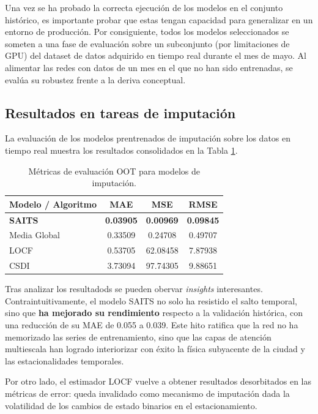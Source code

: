 Una vez se ha probado la correcta ejecución de los modelos en el conjunto histórico, es importante probar que estas tengan capacidad para generalizar en un entorno de producción. Por consiguiente, todos los modelos seleccionados se someten a una fase de evaluación sobre un subconjunto (por limitaciones de GPU) del dataset de datos adquirido en tiempo real durante el mes de mayo. Al alimentar las redes con datos de un mes en el que no han sido entrenadas, se evalúa su robustez frente a la deriva conceptual.

\subsection{Resultados en tareas de imputación}

La evaluación de los modelos prentrenados de imputación sobre los datos en tiempo real muestra los resultados consolidados en la Tabla \ref{tab:resultados_oot_imputacion}.

\begin{table}[H]
	\centering
	\caption{Métricas de evaluación OOT para modelos de imputación.}
	\label{tab:resultados_oot_imputacion}
	\begin{tabular}{lccc}
		\toprule
		\textbf{Modelo / Algoritmo} & \textbf{MAE} & \textbf{MSE} & \textbf{RMSE} \\
		\midrule
		\textbf{SAITS} & \textbf{0.03905} & \textbf{0.00969} & \textbf{0.09845} \\
		Media Global & 0.33509 & 0.24708 & 0.49707 \\
		LOCF & 0.53705 & 62.08458 & 7.87938 \\
		CSDI & 3.73094 & 97.74305 & 9.88651 \\
		\bottomrule
	\end{tabular}
\end{table}


Tras analizar los resultadods se pueden obervar \textit{insights} interesantes. Contraintuitivamente, el modelo SAITS no solo ha resistido el salto temporal, sino que \textbf{ha mejorado su rendimiento} respecto a la validación histórica, con una reducción de su MAE de 0.055 a 0.039. Este hito ratifica que la red no ha memorizado las series de entrenamiento, sino que las capas de atención multiescala han logrado interiorizar con éxito la física subyacente de la ciudad y las estacionalidades temporales.

Por otro lado, el estimador LOCF vuelve a obtener resultados desorbitados en las métricas de error: queda invalidado como mecanismo de imputación dada la volatilidad de los cambios de estado binarios en el estacionamiento.


